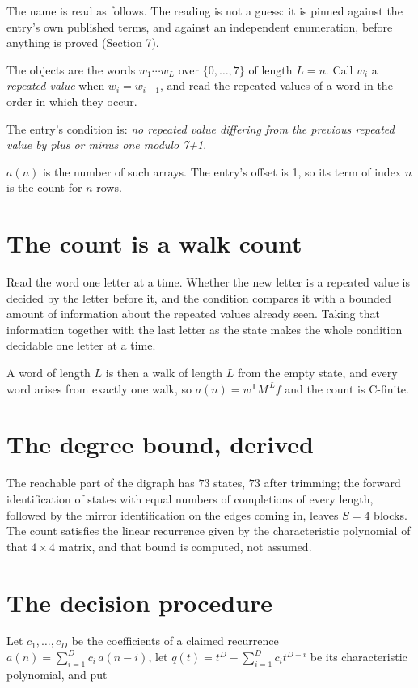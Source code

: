 \documentclass[11pt]{article}
\theoremstyle{definition}
\begin{document}
The name is read as follows. The reading is not a guess: it is pinned against the entry's own published terms, and against an independent enumeration, before anything is proved (Section 7).

The objects are the words $w_1\cdots w_L$ over $\{0,\dots,7\}$ of length $L = n$. Call $w_i$ a {\itshape repeated value} when $w_i = w_{i-1}$, and read the repeated values of a word in the order in which they occur.

The entry's condition is: {\itshape no repeated value differing from the previous repeated value by plus or minus one modulo 7+1}.

$a(n)$ is the number of such arrays. The entry's offset is 1, so its term of index $n$ is the count for $n$ rows.

\section{The count is a walk count}

Read the word one letter at a time. Whether the new letter is a repeated value is decided by the letter before it, and the condition compares it with a bounded amount of information about the repeated values already seen. Taking that information together with the last letter as the state makes the whole condition decidable one letter at a time.

A word of length $L$ is then a walk of length $L$ from the empty state, and every word arises from exactly one walk, so $a(n) = w^{\mathsf T}M^{\,L}f$ and the count is C-finite.

\section{The degree bound, derived}

The reachable part of the digraph has $73$ states, $73$ after trimming; the forward identification of states with equal numbers of completions of every length, followed by the mirror identification on the edges coming in, leaves $S = 4$ blocks. The count satisfies the linear recurrence given by the characteristic polynomial of that $4\times4$ matrix, and that bound is computed, not assumed.

\section{The decision procedure}

Let $c_1,\dots,c_D$ be the coefficients of a claimed recurrence $a(n) = \sum_{i=1}^{D} c_i\,a(n-i)$, let $q(t) = t^{D} - \sum_{i=1}^{D} c_i t^{D-i}$ be its characteristic polynomial, and put
\end{document}
